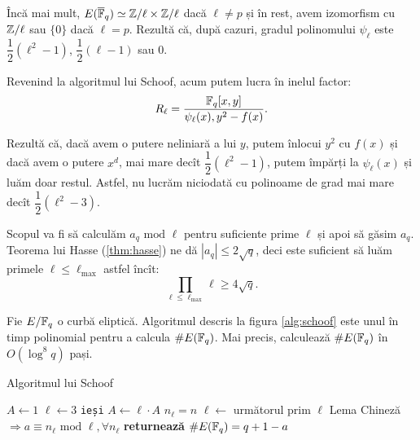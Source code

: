 Încă mai mult, $ E(\overline{\mathbb{F}}_q) \simeq \mathbb{Z}/\ell \times \mathbb{Z}/\ell $
dacă $ \ell \neq p $ și în rest, avem izomorfism cu $ \mathbb{Z}/\ell $ sau $ \{ 0 \} $
dacă $ \ell = p $. Rezultă că, după cazuri, gradul polinomului $ \psi_\ell $
este $ \dfrac{1}{2}(\ell^2 - 1) $, $ \dfrac{1}{2} (\ell - 1) $ sau $ 0 $.

Revenind la algoritmul lui Schoof, acum putem lucra în inelul factor:
\[
    R_\ell = \dfrac{\mathbb{F}_q[x, y]}{\psi_\ell(x), y^2 - f(x)}.
\]

Rezultă că, dacă avem o putere neliniară a lui $ y $, putem înlocui
$ y^2 $ cu $ f(x) $ și dacă avem o putere $ x^d $, mai mare decît
$ \dfrac{1}{2}(\ell^2 - 1) $, putem împărți la $ \psi_\ell(x) $ și luăm
doar restul. Astfel, nu lucrăm niciodată cu polinoame de grad mai mare
decît $ \dfrac{1}{2}(\ell^2 - 3) $.

Scopul va fi să calculăm $ a_q \text{ mod } \ell $ pentru suficiente
prime $ \ell $ și apoi să găsim $ a_q $. Teorema lui Hasse (\ref{thm:hasse})
ne dă $ |a_q| \leq 2 \sqrt{q} $, deci este suficient să luăm primele
$ \ell \leq \ell_{\max} $ astfel încît:
\[
    \prod_{\ell \leq \ell_{\max}} \ell \geq 4 \sqrt{q}.
\]

\begin{theorem}\label{thm:schoof}
  Fie $ E/\mathbb{F}_q $ o curbă eliptică. Algoritmul descris la figura \ref{alg:schoof} este
  unul în timp polinomial pentru a calcula $ \# E(\mathbb{F}_q) $. Mai precis,
  calculează $ \# E(\mathbb{F}_q) $ în $ O(\log^8 q) $ pași.
\end{theorem}

\begin{algorithm}
  \caption{Algoritmul lui Schoof}
  \begin{algorithmic}[1]
      \State $ A \gets 1 $
      \State $ \ell \gets 3 $
            \texttt{ieși}
          \EndIf
        \EndWhile
        \State $ A \gets \ell \cdot A $
        \State $ n_\ell = n $
        \State $ \ell \gets $ următorul prim $ \ell $
      \EndWhile
      \State Lema Chineză $ \Rightarrow a \equiv n_\ell \text{ mod } \ell, \forall n_\ell $
      \State \textbf{returnează} $ \# E(\mathbb{F}_q) = q + 1 - a $
    \EndProcedure
  \end{algorithmic}
  \label{alg:schoof}
\end{algorithm}

